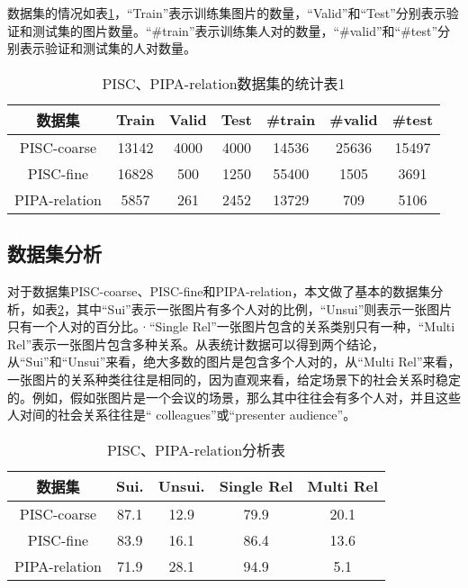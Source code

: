 数据集的情况如表\ref{tab:exp-sta-one}，``Train''表示训练集图片的数量，``Valid''和``Test''分别表示验证和测试集的图片数量。``\#train''表示训练集人对的数量，``\#valid''和``\#test''分别表示验证和测试集的人对数量。
\begin{table}[htpb]
  \centering
  \caption{PISC、PIPA-relation数据集的统计表1}
  \label{tab:exp-sta-one}
  \setlength{\tabcolsep}{4.5mm}
  \begin{tabular}{c|c|c|c|c|c|c}
    \toprule
    数据集 & Train & Valid & Test & \#train  &  \#valid &  \#test  \\
    \midrule
    PISC-coarse & 13142 & 4000 & 4000 & 14536 & 25636 & 15497   \\
    \midrule
    PISC-fine &  16828 & 500 & 1250 & 55400 & 1505 & 3691 \\
    \midrule
    PIPA-relation & 5857 & 261 & 2452 & 13729 & 709 & 5106 \\
    \bottomrule
  \end{tabular}
\end{table}

\subsection{数据集分析}

对于数据集PISC-coarse、PISC-fine和PIPA-relation，本文做了基本的数据集分析，如表\ref{tab:exp-sta-two}，其中``Sui''表示一张图片有多个人对的比例，``Unsui''则表示一张图片只有一个人对的百分比。·``Single Rel''一张图片包含的关系类别只有一种，``Multi Rel''表示一张图片包含多种关系。从表统计数据可以得到两个结论，从``Sui''和``Unsui''来看，绝大多数的图片是包含多个人对的，从``Multi Rel''来看，一张图片的关系种类往往是相同的，因为直观来看，给定场景下的社会关系时稳定的。例如，假如张图片是一个会议的场景，那么其中往往会有多个人对，并且这些人对间的社会关系往往是``
colleagues''或``presenter audience''。
\begin{table}[htpb]
  \centering
  \caption{PISC、PIPA-relation分析表}
  \label{tab:exp-sta-two}
  \begin{tabular}{c|c|c|c|c}
    \toprule
    数据集 & Sui. & Unsui. & Single Rel & Multi Rel \\
    \midrule
    PISC-coarse  & 87.1 & 12.9 & 79.9 & 20.1 \\
    \midrule
    PISC-fine  & 83.9 & 16.1 & 86.4 & 13.6 \\
    \midrule
    PIPA-relation & 71.9 & 28.1 & 94.9 & 5.1 \\
    \bottomrule
  \end{tabular}
\end{table}

